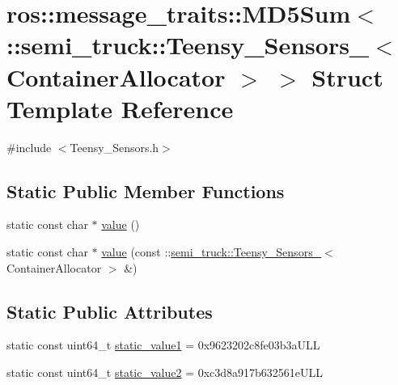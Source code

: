 \hypertarget{structros_1_1message__traits_1_1_m_d5_sum_3_01_1_1semi__truck_1_1_teensy___sensors___3_01_container_allocator_01_4_01_4}{}\section{ros\+:\+:message\+\_\+traits\+:\+:M\+D5\+Sum$<$ \+:\+:semi\+\_\+truck\+:\+:Teensy\+\_\+\+Sensors\+\_\+$<$ Container\+Allocator $>$ $>$ Struct Template Reference}
\label{structros_1_1message__traits_1_1_m_d5_sum_3_01_1_1semi__truck_1_1_teensy___sensors___3_01_container_allocator_01_4_01_4}


{\ttfamily \#include $<$Teensy\+\_\+\+Sensors.\+h$>$}

\subsection*{Static Public Member Functions}
\begin{DoxyCompactItemize}
\item 
static const char $\ast$ \hyperlink{structros_1_1message__traits_1_1_m_d5_sum_3_01_1_1semi__truck_1_1_teensy___sensors___3_01_container_allocator_01_4_01_4_abdb9880b12a2bc0f6c02d903fb095652}{value} ()
\item 
static const char $\ast$ \hyperlink{structros_1_1message__traits_1_1_m_d5_sum_3_01_1_1semi__truck_1_1_teensy___sensors___3_01_container_allocator_01_4_01_4_a8c399cfd0cb68d6603a34785576c8925}{value} (const \+::\hyperlink{structsemi__truck_1_1_teensy___sensors__}{semi\+\_\+truck\+::\+Teensy\+\_\+\+Sensors\+\_\+}$<$ Container\+Allocator $>$ \&)
\end{DoxyCompactItemize}
\subsection*{Static Public Attributes}
\begin{DoxyCompactItemize}
\item 
static const uint64\+\_\+t \hyperlink{structros_1_1message__traits_1_1_m_d5_sum_3_01_1_1semi__truck_1_1_teensy___sensors___3_01_container_allocator_01_4_01_4_ac249bb869c2dce4811f8a8eb56cc4cef}{static\+\_\+value1} = 0x9623202c8fe03b3a\+U\+LL
\item 
static const uint64\+\_\+t \hyperlink{structros_1_1message__traits_1_1_m_d5_sum_3_01_1_1semi__truck_1_1_teensy___sensors___3_01_container_allocator_01_4_01_4_a58416065aee723162e985d3e3cba2ee1}{static\+\_\+value2} = 0xc3d8a917b632561e\+U\+LL
\end{DoxyCompactItemize}


